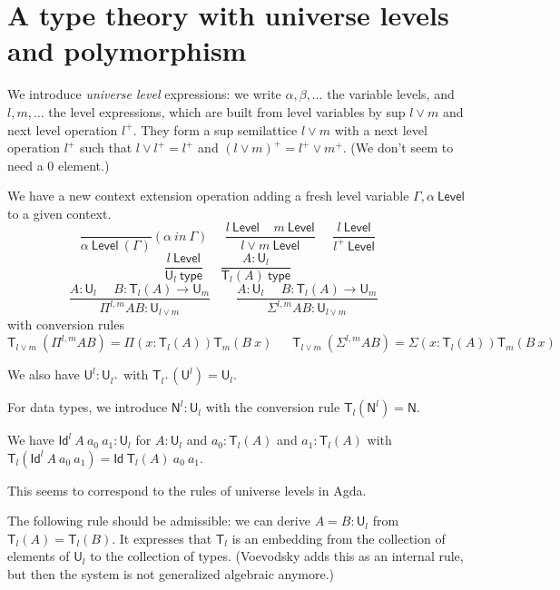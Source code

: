 \documentclass[11pt,a4paper]{article}
\newcommand{\Id}{\mathsf{Id}}
\def\NN{\mathsf{N}}
\def\UU{\mathsf{U}}
\def\Level{\mathsf{Level}}
\newcommand{\type}{\mathsf{type}}
\newcommand{\T}{\mathsf{T}}
\begin{document}
\section{A type theory with universe levels and polymorphism }

We introduce {\em universe level} expressions: we write $\alpha,\beta,\dots$
the variable levels, and $l,m,\dots$ the level expressions, which are built from level variables
by sup $l \vee m$ and next level operation $l^+$.
They form a sup semilattice $l\vee m$
with a next level operation $l^+$ such that $l \vee l^+ = l^+$
and $(l\vee m)^+ = l^+\vee m^+$. (We don't seem to need a $0$ element.)

We have a new context extension operation adding a fresh level variable $\Gamma,\alpha~\Level$
to a given context.
$$
\frac{}{\alpha~\Level~(\Gamma)}(\alpha~in~\Gamma)~~~~~~
\frac{l~\Level~~~~~m~\Level}{l\vee m~\Level}~~~~~~
\frac{l~\Level}{l^+~\Level}~~~~~~
$$
$$
\frac{l~\Level}{\UU_{l}~\type}~~~~~~
\frac{A:\UU_{l}}{\T_{l}(A)~\type}~~~~~~
$$
$$
\frac{A:\UU_{l}~~~~~~B:\T_{l}(A)\rightarrow \UU_{m}}
     {\Pi^{l,m} A B:\UU_{l\vee m}}~~~~~~~~~
\frac{A:\UU_{l}~~~~~~B:\T_{l}(A)\rightarrow \UU_{m}}
     {\Sigma^{l,m} A B:\UU_{l\vee m}}~~~~~~~~~
$$
with conversion rules
$$
\T_{l\vee m}~(\Pi^{l,m} A B) = \Pi (x:\T_{l}(A)) \T_{m}(B~x)~~~~~~~
\T_{l\vee m}~(\Sigma^{l,m} A B) = \Sigma (x:\T_{l}(A)) \T_{m}(B~x)~~~~~~~
$$

\medskip

We also have ${\UU^{l}}:\UU_{l^+}$ with
$\T_{l^+}({\UU^{l}}) = \UU_{l}$.

\medskip

For data types, we introduce $\NN^{l}:\UU_{l}$ with the conversion rule
$\T_{l}(\NN^{l}) = \NN$.

We have $\Id^l~A~a_0~a_1:\UU_l$ for $A:\UU_l$ and $a_0:\T_l(A)$ and $a_1:\T_l(A)$
with $\T_l(\Id^l~A~a_0~a_1) = \Id~\T_l(A)~a_0~a_1$.

\medskip

 This seems to correspond to the rules of universe levels in Agda.

\medskip

The following rule should be admissible:
we can derive $A = B : \UU_l$ from $\T_l(A) = \T_l(B)$.
 It expresses that $\T_l$ is an embedding from the collection of elements of $\UU_l$
 to the collection of types.
 (Voevodsky \cite{VV} adds this as an internal rule, but then the system is not
 generalized algebraic anymore.)
\end{document}
